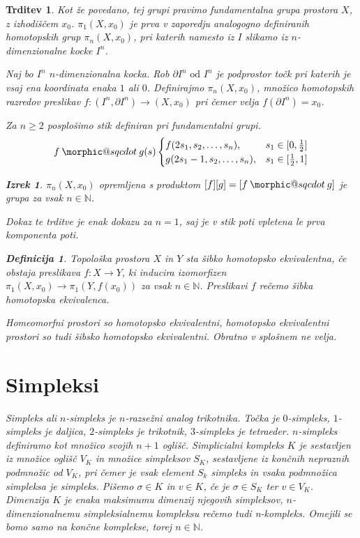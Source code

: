 \documentclass[a4paper,12pt]{article}
\makeatletter
\DeclareRobustCommand{\sqcdot}{\mathbin{\mathpalette\morphic@sqcdot\relax}}
\newcommand{\morphic@sqcdot}[2]{%
\sbox\z@{$\m@th#1\centerdot$}%
\ht\z@=.33333\ht\z@
\vcenter{\box\z@}%
}
\theoremstyle{definition}
\newtheorem{definicija}{Definicija}
\theoremstyle{plain}
\newtheorem{izrek}{Izrek}
\theoremstyle{definition}
\theoremstyle{plain}
\newtheorem{trditev}{Trditev}
\theoremstyle{plain}
\theoremstyle{plain}
\theoremstyle{plain}
\makeatother
\begin{document}
\begin{trditev}
Kot že povedano, tej grupi pravimo fundamentalna grupa prostora $X$, z izhodiščem $x_0$. $\pi_1(X,x_0)$ je prva v zaporedju analogogno definiranih homotopskih grup $\pi_n(X,x_0)$, pri katerih namesto iz $I$ slikamo iz $n$-dimenzionalne kocke $I^n$.


Naj bo $I^n$ $n$-dimenzionalna kocka. Rob $\partial I^n \text{ od } I^n$ je podprostor točk pri katerih je vsaj ena koordinata enaka $1$ ali $0$. Definirajmo $\pi_n(X,x_0)$, množico homotopskih razredov preslikav $f:(I^n,\partial I^n) \rightarrow (X,x_0)$ pri čemer velja $f(\partial I^n) = x_0$.


Za $n\ge 2$ posplošimo stik definiran pri fundamentalni grupi.
$$ f\sqcdot g(s) \begin{cases}
    f(2s_1,s_2,\ldots,s_n), & s_1\in [0,\frac{1}{2}] \\
    g(2s_1-1,s_2,\ldots,s_n), & s_1 \in [\frac{1}{2},1]
\end{cases}
$$

\begin{izrek}
    $\pi_n(X,x_0)$ opremljena s produktom $[f][g] = [f\sqcdot g]$ je grupa za vsak $n \in \mathds{N}$.
\end{izrek}

Dokaz te trditve je enak dokazu za $n=1$, saj je v stik poti vpletena le prva komponenta poti.

\begin{definicija}
    Topološka prostora $X$ in $Y$ sta \textit{šibko homotopsko ekvivalentna}, če obstaja preslikava $f:X\rightarrow Y$, ki inducira izomorfizen $\pi_1(X,x_0)\rightarrow \pi_1(Y,f(x_0))$ za vsak $n \in \mathbb{N}$. Preslikavi $f$ rečemo \textit{šibka homotopska ekvivalenca.}
\end{definicija}

Homeomorfni prostori so homotopsko ekvivalentni, homotopsko ekvivalentni prostori so tudi šibsko homotopsko ekvivalentni. Obratno v splošnem ne velja.
\section{Simpleksi}

\textit{Simpleks} ali $n$-simpleks je $n$-razsežni analog trikotnika. Točka je $0$-simpleks, $1$-simpleks je daljica, $2$-simpleks je trikotnik,
$3$-simpleks je tetraeder. $n$-simpleks definiramo kot množico svojih $n+1$ oglišč. \textit{Simplicialni kompleks $K$} je sestavljen iz množice oglišč $V_K$ in množice simpleksov $S_K$, sestavljene iz končnih nepraznih podmnožic od $V_K$, pri čemer je vsak element $S_k$ simpleks in vsaka podmnožica simpleksa je simpleks. Pišemo $\sigma \in K$ in $v \in K$, če je $\sigma \in S_K$ ter $v \in V_K$. Dimenzija $K$ je enaka maksimumu dimenzij njegovih simpleksov, $n$-dimenzionalnemu simpleksialnemu kompleksu rečemo tudi \textit{n-kompleks}. Omejili se bomo samo na končne komplekse, torej $n \in \mathbb{N}$.


\end{trditev}
\end{document}
